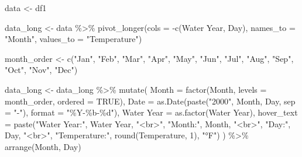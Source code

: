 \documentclass[
]{book}
\newenvironment{Shaded}{\begin{snugshade}}{\end{snugshade}}
\newcommand{\AttributeTok}[1]{\textcolor[rgb]{0.77,0.63,0.00}{#1}}
\newcommand{\ConstantTok}[1]{\textcolor[rgb]{0.00,0.00,0.00}{#1}}
\newcommand{\DecValTok}[1]{\textcolor[rgb]{0.00,0.00,0.81}{#1}}
\newcommand{\FunctionTok}[1]{\textcolor[rgb]{0.00,0.00,0.00}{#1}}
\newcommand{\NormalTok}[1]{#1}
\newcommand{\OtherTok}[1]{\textcolor[rgb]{0.56,0.35,0.01}{#1}}
\newcommand{\SpecialCharTok}[1]{\textcolor[rgb]{0.00,0.00,0.00}{#1}}
\newcommand{\StringTok}[1]{\textcolor[rgb]{0.31,0.60,0.02}{#1}}
\theoremstyle{definition}
\theoremstyle{definition}
\theoremstyle{definition}
\theoremstyle{definition}
\theoremstyle{remark}
\begin{document}
\begin{Shaded}
\begin{Highlighting}[]
\NormalTok{data }\OtherTok{\textless{}{-}}\NormalTok{ df1}

\NormalTok{data\_long }\OtherTok{\textless{}{-}}\NormalTok{ data }\SpecialCharTok{\%\textgreater{}\%}
  \FunctionTok{pivot\_longer}\NormalTok{(}\AttributeTok{cols =} \SpecialCharTok{{-}}\FunctionTok{c}\NormalTok{(}\StringTok{\textasciigrave{}}\AttributeTok{Water Year}\StringTok{\textasciigrave{}}\NormalTok{, Day),}
               \AttributeTok{names\_to =} \StringTok{"Month"}\NormalTok{,}
               \AttributeTok{values\_to =} \StringTok{"Temperature"}\NormalTok{)}

\NormalTok{month\_order }\OtherTok{\textless{}{-}} \FunctionTok{c}\NormalTok{(}\StringTok{"Jan"}\NormalTok{, }\StringTok{"Feb"}\NormalTok{, }\StringTok{"Mar"}\NormalTok{, }\StringTok{"Apr"}\NormalTok{, }\StringTok{"May"}\NormalTok{, }\StringTok{"Jun"}\NormalTok{, }\StringTok{"Jul"}\NormalTok{, }\StringTok{"Aug"}\NormalTok{, }\StringTok{"Sep"}\NormalTok{, }\StringTok{"Oct"}\NormalTok{, }\StringTok{"Nov"}\NormalTok{, }\StringTok{"Dec"}\NormalTok{)}

\NormalTok{data\_long }\OtherTok{\textless{}{-}}\NormalTok{ data\_long }\SpecialCharTok{\%\textgreater{}\%}
  \FunctionTok{mutate}\NormalTok{(}
    \AttributeTok{Month =} \FunctionTok{factor}\NormalTok{(Month, }\AttributeTok{levels =}\NormalTok{ month\_order, }\AttributeTok{ordered =} \ConstantTok{TRUE}\NormalTok{),}
    \AttributeTok{Date =} \FunctionTok{as.Date}\NormalTok{(}\FunctionTok{paste}\NormalTok{(}\StringTok{"2000"}\NormalTok{, Month, Day, }\AttributeTok{sep =} \StringTok{"{-}"}\NormalTok{), }\AttributeTok{format =} \StringTok{"\%Y{-}\%b{-}\%d"}\NormalTok{),}
    \StringTok{\textasciigrave{}}\AttributeTok{Water Year}\StringTok{\textasciigrave{}} \OtherTok{=} \FunctionTok{as.factor}\NormalTok{(}\StringTok{\textasciigrave{}}\AttributeTok{Water Year}\StringTok{\textasciigrave{}}\NormalTok{),}
    \AttributeTok{hover\_text =} \FunctionTok{paste}\NormalTok{(}\StringTok{"Water Year:"}\NormalTok{, }\StringTok{\textasciigrave{}}\AttributeTok{Water Year}\StringTok{\textasciigrave{}}\NormalTok{, }\StringTok{"\textless{}br\textgreater{}"}\NormalTok{,}
                       \StringTok{"Month:"}\NormalTok{, Month, }\StringTok{"\textless{}br\textgreater{}"}\NormalTok{,}
                       \StringTok{"Day:"}\NormalTok{, Day, }\StringTok{"\textless{}br\textgreater{}"}\NormalTok{,}
                       \StringTok{"Temperature:"}\NormalTok{, }\FunctionTok{round}\NormalTok{(Temperature, }\DecValTok{1}\NormalTok{), }\StringTok{"°F"}\NormalTok{)}
\NormalTok{  ) }\SpecialCharTok{\%\textgreater{}\%}
  \FunctionTok{arrange}\NormalTok{(Month, Day)}


\end{Highlighting}
\end{Shaded}
\end{document}
